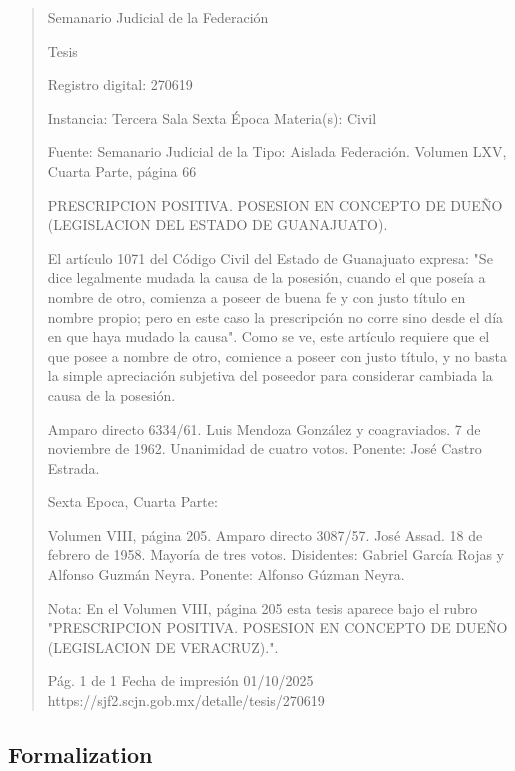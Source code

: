 \documentclass[11pt,a4paper]{article}
\begin{document}
\begin{quote}
                                                   Semanario Judicial de la Federación

                                                  Tesis

 Registro digital: 270619

 Instancia: Tercera Sala          Sexta Época                        Materia(s): Civil

                                  Fuente: Semanario Judicial de la  Tipo: Aislada
                                  Federación.
                                  Volumen LXV, Cuarta Parte, página
                                  66


PRESCRIPCION POSITIVA. POSESION EN CONCEPTO DE DUEÑO (LEGISLACION DEL
ESTADO DE GUANAJUATO).


El artículo 1071 del Código Civil del Estado de Guanajuato expresa: "Se dice legalmente mudada la
causa de la posesión, cuando el que poseía a nombre de otro, comienza a poseer de buena fe y
con justo título en nombre propio; pero en este caso la prescripción no corre sino desde el día en
que haya mudado la causa". Como se ve, este artículo requiere que el que posee a nombre de otro,
comience a poseer con justo título, y no basta la simple apreciación subjetiva del poseedor para
considerar cambiada la causa de la posesión.


Amparo directo 6334/61. Luis Mendoza González y coagraviados. 7 de noviembre de 1962.
Unanimidad de cuatro votos. Ponente: José Castro Estrada.

Sexta Epoca, Cuarta Parte:

Volumen VIII, página 205. Amparo directo 3087/57. José Assad. 18 de febrero de 1958. Mayoría de
tres votos. Disidentes: Gabriel García Rojas y Alfonso Guzmán Neyra. Ponente: Alfonso Gúzman
Neyra.

Nota: En el Volumen VIII, página 205 esta tesis aparece bajo el rubro "PRESCRIPCION POSITIVA.
POSESION EN CONCEPTO DE DUEÑO (LEGISLACION DE VERACRUZ).".




                                             Pág. 1 de 1          Fecha de impresión 01/10/2025
  https://sjf2.scjn.gob.mx/detalle/tesis/270619

\end{quote}

\subsection{Formalization}
\end{document}
